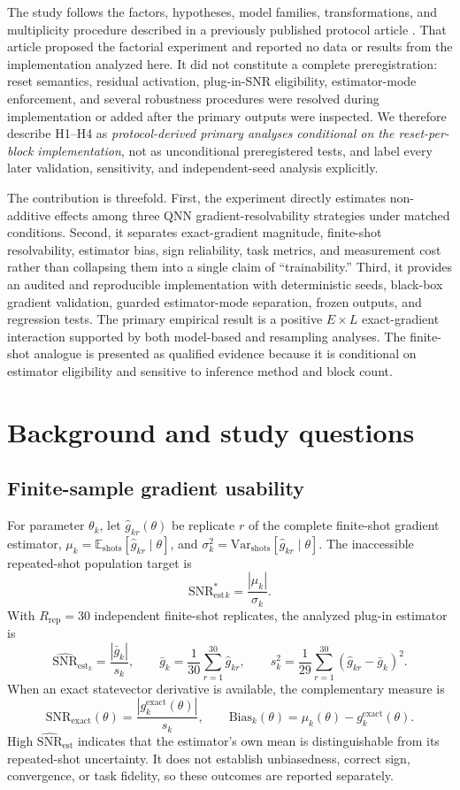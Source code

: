 \documentclass[pdflatex,sn-mathphys-num,Numbered]{sn-jnl}
\newcommand{\snrstar}{\mathrm{SNR}^{*}_{\mathrm{est}}}
\newcommand{\snrest}{\widehat{\mathrm{SNR}}_{\mathrm{est}}}
\newcommand{\snrexact}{\mathrm{SNR}_{\mathrm{exact}}}
\begin{document}
The study follows the factors, hypotheses, model families, transformations, and multiplicity procedure described in a previously published protocol article \cite{shen2026gradient}. That article proposed the factorial experiment and reported no data or results from the implementation analyzed here. It did not constitute a complete preregistration: reset semantics, residual activation, plug-in-SNR eligibility, estimator-mode enforcement, and several robustness procedures were resolved during implementation or added after the primary outputs were inspected. We therefore describe H1--H4 as \emph{protocol-derived primary analyses conditional on the reset-per-block implementation}, not as unconditional preregistered tests, and label every later validation, sensitivity, and independent-seed analysis explicitly.

The contribution is threefold. First, the experiment directly estimates non-additive effects among three QNN gradient-resolvability strategies under matched conditions. Second, it separates exact-gradient magnitude, finite-shot resolvability, estimator bias, sign reliability, task metrics, and measurement cost rather than collapsing them into a single claim of ``trainability.'' Third, it provides an audited and reproducible implementation with deterministic seeds, black-box gradient validation, guarded estimator-mode separation, frozen outputs, and regression tests. The primary empirical result is a positive $E\times L$ exact-gradient interaction supported by both model-based and resampling analyses. The finite-shot analogue is presented as qualified evidence because it is conditional on estimator eligibility and sensitive to inference method and block count.

\section{Background and study questions}

\subsection{Finite-sample gradient usability}

For parameter $\theta_k$, let $\hat g_{kr}(\theta)$ be replicate $r$ of the complete finite-shot gradient estimator, $\mu_k=\mathbb{E}_{\mathrm{shots}}[\hat g_{kr}\mid\theta]$, and $\sigma_k^2=\mathrm{Var}_{\mathrm{shots}}[\hat g_{kr}\mid\theta]$. The inaccessible repeated-shot population target is
\[
\snrstar_k=\frac{|\mu_k|}{\sigma_k}.
\]
With $R_{\mathrm{rep}}=30$ independent finite-shot replicates, the analyzed plug-in estimator is
\[
\snrest_k=\frac{|\bar g_k|}{s_k},\qquad
\bar g_k=\frac{1}{30}\sum_{r=1}^{30}\hat g_{kr},\qquad
s_k^2=\frac{1}{29}\sum_{r=1}^{30}(\hat g_{kr}-\bar g_k)^2.
\]
When an exact statevector derivative is available, the complementary measure is
\[
\snrexact(\theta)=
\frac{|g_k^{\mathrm{exact}}(\theta)|}{s_k},
\qquad
\mathrm{Bias}_k(\theta)=\mu_k(\theta)-g_k^{\mathrm{exact}}(\theta).
\]
High $\snrest$ indicates that the estimator's own mean is distinguishable from its repeated-shot uncertainty. It does not establish unbiasedness, correct sign, convergence, or task fidelity, so these outcomes are reported separately.
\end{document}
